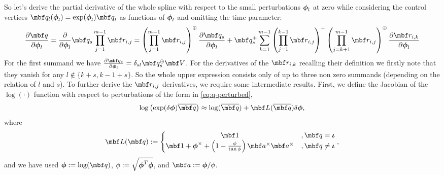 \documentclass[11pt,a4paper,oneside]{article}
\newcommand{\order}{m}
\begin{document}
So let's derive the partial derivative of the whole spline with respect to the small perturbations ${\boldsymbol{\phi}}_l$ at zero while considering the control vertices $\mbf q_l(\mbs\phi_l) = \exp(\mbs\phi_l)\bar {\mbf q}_l $ as functions of ${\boldsymbol{\phi}}_l$ and omitting the time parameter: 
\begin{equation}\label{eq:qcontrol-vertec-derivation}
 \frac{\partial \mbf q}{\partial \mbs \phi_l} 
 = \frac{\partial}{\partial \mbs \phi_l} \mbf q_{s}\prod_{j = 1}^{\order - 1} \mbf r_{i, j}
 = \left(\prod_{j = 1}^{\order - 1}  \mbf r_{i, j}\right)^\oplus \frac{\partial \mbf q_{s}}{\partial \mbs \phi_l} + \mbf q_{s}^+ \sum_{k = 1}^{\order - 1} \left(\prod_{j = 1}^{k-1}\mbf r_{i, j}\right)^{+} \left(\prod_{j = k + 1}^{\order - 1}\mbf r_{i, j}\right)^\oplus \frac{\partial \mbf r_{i, k}}{\partial \mbs \phi_l} 
\end{equation}
For the first summand we have $\frac{\partial \mbf q_{s}}{\partial \mbs \phi_l} = \delta_{sl} \mbf q_s^{\oplus} \mbf V$. For the derivatives of the $\mbf r_{i, k}$ recalling their definition we firstly note that they vanish for any $l \not \in \{k + s, k - 1 + s\} $.
So the whole upper expression consists only of up to three non zero summands (depending on the relation of $l$ and $s$). To further derive the $\mbf r_{i, j}$ derivatives, we require some intermediate results. First, we define the Jacobian of the $\log(\cdot)$ function with respect to perturbations of the form in \eqref{eq:q-perturbed},
\begin{equation}
	\label{eq:qlog-perturbed}
	\log\left( \exp(\mbsdel \phi)\mbfbar q \right) 
	\approx \log(\mbfbar q) + \mbf L(\mbfbar q) \mbsdel \phi,
\end{equation}
where
\begin{equation}
	\label{eq:loginvS}
	\mbf L(\mbf q) := \left\{ \begin{matrix} \mbf 1 &, \mbf q = \mbs \iota \\ \mbf 1 + \mbs \phi^\times + \left(1 - \frac{\phi }{\tan \phi} \right)\mbf a^\times \mbf a^\times &, \mbf q \not= \mbs\iota \end{matrix}\right.,
\end{equation}
and we have used $\mbs \phi := \log(\mbf q)$, $ \phi := \sqrt{{\boldsymbol{\phi}}^T {\boldsymbol{\phi}}}$, and $\mbf a := \mbs \phi /  \phi$. 
\end{document}
